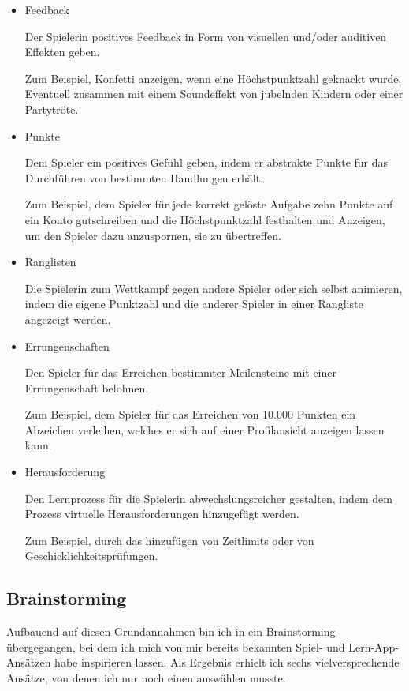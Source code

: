 \begin{itemize}
  \item Feedback
  
  Der Spielerin positives Feedback in Form von visuellen und/oder auditiven Effekten geben.

  Zum Beispiel, Konfetti anzeigen, wenn eine Höchstpunktzahl geknackt wurde. Eventuell zusammen mit einem Soundeffekt von jubelnden Kindern oder einer Partytröte.

  \item Punkte
  
  Dem Spieler ein positives Gefühl geben, indem er abstrakte Punkte für das Durchführen von bestimmten Handlungen erhält.

  Zum Beispiel, dem Spieler für jede korrekt gelöste Aufgabe zehn Punkte auf ein Konto gutschreiben und die Höchstpunktzahl festhalten und Anzeigen, um den Spieler dazu anzuspornen, sie zu übertreffen.

  \item Ranglisten
  
  Die Spielerin zum Wettkampf gegen andere Spieler oder sich selbst animieren, indem die eigene Punktzahl und die anderer Spieler in einer Rangliste angezeigt werden.

  \item Errungenschaften
  
  Den Spieler für das Erreichen bestimmter Meilensteine mit einer Errungenschaft belohnen.

  Zum Beispiel, dem Spieler für das Erreichen von 10.000 Punkten ein Abzeichen verleihen, welches er sich auf einer Profilansicht anzeigen lassen kann.

  \item Herausforderung
  
  Den Lernprozess für die Spielerin abwechslungsreicher gestalten, indem dem Prozess virtuelle Herausforderungen hinzugefügt werden.
  
  Zum Beispiel, durch das hinzufügen von Zeitlimits oder von Geschicklichkeitsprüfungen.
\end{itemize}

\subsection{Brainstorming}

Aufbauend auf diesen Grundannahmen bin ich in ein Brainstorming übergegangen, bei dem ich mich von mir bereits bekannten Spiel- und Lern-App-Ansätzen habe inspirieren lassen.
Als Ergebnis erhielt ich sechs vielversprechende Ansätze, von denen ich nur noch einen auswählen musste.

